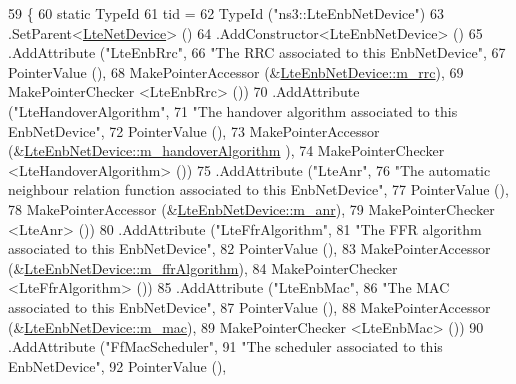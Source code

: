 \begin{DoxyCode}
59 \{
60   \textcolor{keyword}{static} TypeId
61     tid =
62     TypeId (\textcolor{stringliteral}{"ns3::LteEnbNetDevice"})
63     .SetParent<\hyperlink{classns3_1_1LteNetDevice_a6e36295fe539e3936ffbf81a260c4d24}{LteNetDevice}> ()
64     .AddConstructor<LteEnbNetDevice> ()
65     .AddAttribute (\textcolor{stringliteral}{"LteEnbRrc"},
66                    \textcolor{stringliteral}{"The RRC associated to this EnbNetDevice"},
67                    PointerValue (),
68                    MakePointerAccessor (&\hyperlink{classns3_1_1LteEnbNetDevice_a82f434e1c6e250945e6b0c48fb3c9ea7}{LteEnbNetDevice::m\_rrc}),
69                    MakePointerChecker <LteEnbRrc> ())
70     .AddAttribute (\textcolor{stringliteral}{"LteHandoverAlgorithm"},
71                    \textcolor{stringliteral}{"The handover algorithm associated to this EnbNetDevice"},
72                    PointerValue (),
73                    MakePointerAccessor (&\hyperlink{classns3_1_1LteEnbNetDevice_a3b8d9155a06dbda03d264ca8160d45b1}{LteEnbNetDevice::m\_handoverAlgorithm}
      ),
74                    MakePointerChecker <LteHandoverAlgorithm> ())
75     .AddAttribute (\textcolor{stringliteral}{"LteAnr"},
76                    \textcolor{stringliteral}{"The automatic neighbour relation function associated to this EnbNetDevice"},
77                    PointerValue (),
78                    MakePointerAccessor (&\hyperlink{classns3_1_1LteEnbNetDevice_a0d2e3dc6554054a072aea2680f21c622}{LteEnbNetDevice::m\_anr}),
79                    MakePointerChecker <LteAnr> ())
80     .AddAttribute (\textcolor{stringliteral}{"LteFfrAlgorithm"},
81                    \textcolor{stringliteral}{"The FFR algorithm associated to this EnbNetDevice"},
82                    PointerValue (),
83                    MakePointerAccessor (&\hyperlink{classns3_1_1LteEnbNetDevice_adb9f14fdd2cd1c70502747e2de2d9332}{LteEnbNetDevice::m\_ffrAlgorithm}),
84                    MakePointerChecker <LteFfrAlgorithm> ())
85     .AddAttribute (\textcolor{stringliteral}{"LteEnbMac"},
86                    \textcolor{stringliteral}{"The MAC associated to this EnbNetDevice"},
87                    PointerValue (),
88                    MakePointerAccessor (&\hyperlink{classns3_1_1LteEnbNetDevice_ab1d201589711cdfda0bb52f37b01be5d}{LteEnbNetDevice::m\_mac}),
89                    MakePointerChecker <LteEnbMac> ())
90     .AddAttribute (\textcolor{stringliteral}{"FfMacScheduler"},
91                    \textcolor{stringliteral}{"The scheduler associated to this EnbNetDevice"},
92                    PointerValue (),

\end{DoxyCode}
